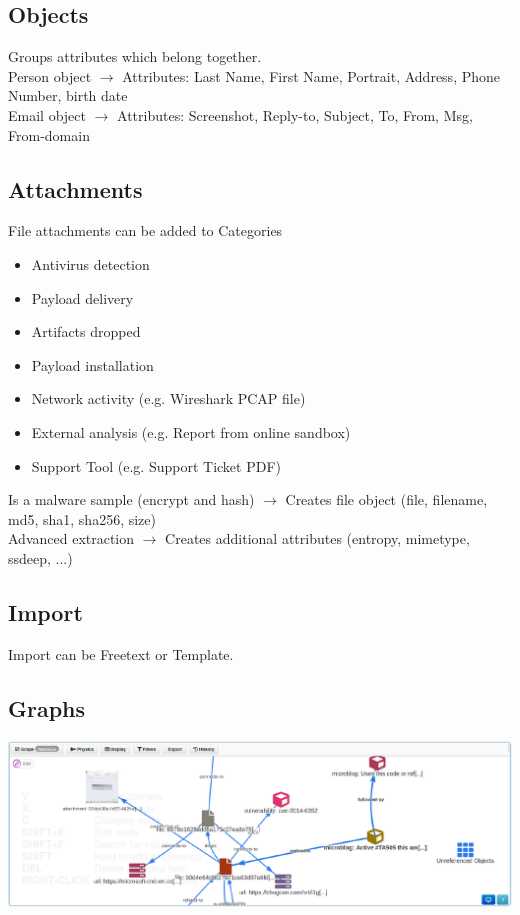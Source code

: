 \subsection{Objects}
Groups attributes which belong together.\\
Person object $\rightarrow$ Attributes: Last Name, First Name, Portrait, Address, Phone Number, birth date\\
Email object $\rightarrow$ Attributes: Screenshot, Reply-to, Subject, To, From, Msg, From-domain
\subsection{Attachments}
File attachments can be added to Categories
\begin{itemize}
    \item Antivirus detection
    \item Payload delivery
    \item Artifacts dropped
    \item Payload installation
    \item Network activity (e.g. Wireshark PCAP file)
    \item External analysis (e.g. Report from online sandbox)
    \item Support Tool (e.g. Support Ticket PDF)
\end{itemize}
Is a malware sample (encrypt and hash) $\rightarrow$ Creates file object (file, filename, md5, sha1, sha256, size)\\
Advanced extraction $\rightarrow$ Creates additional attributes (entropy, mimetype, ssdeep, ...)

\subsection{Import}
Import can be Freetext or Template.

\subsection{Graphs}
\includegraphics[width=\linewidth]{./img/15-misp/graph}

